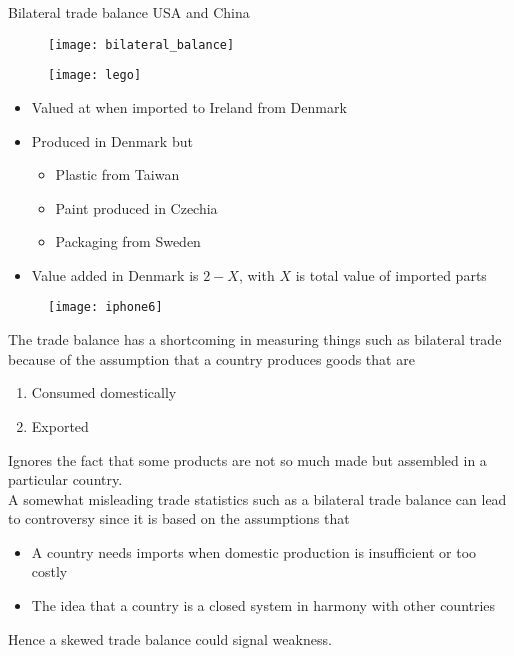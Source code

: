 \documentclass{beamer}
\begin{document}
\begin{frame}{Bilateral trade balance USA and China}
  \begin{figure}
    \texttt{[image: bilateral\_balance]}
  \end{figure}
\end{frame}


\begin{frame}{}
  \begin{figure}
    \texttt{[image: lego]}
  \end{figure}
  \begin{itemize}
    \item Valued at  when imported to Ireland from Denmark
    \item Produced in Denmark but
    \begin{itemize}
      \item Plastic from Taiwan
      \item Paint produced in Czechia
      \item Packaging from Sweden
    \end{itemize}
    \item Value added in Denmark is $2-X$, with $X$ is total value of imported parts
  \end{itemize}
\end{frame}

\begin{frame}
  \begin{figure}\centering
    \texttt{[image: iphone6]}
  \end{figure}
\end{frame}

\begin{frame}
  The trade balance has a shortcoming in measuring things such as bilateral trade because of the assumption that a country produces goods that are
  \begin{enumerate}
    \item Consumed domestically
    \item Exported
  \end{enumerate}
  Ignores the fact that some products are not so much made but assembled in a particular country.\\
  \bigskip
  A somewhat misleading trade statistics such as a bilateral trade balance can lead to controversy since it is based on the assumptions that  
  \begin{itemize}
    \item A country needs imports when domestic production is insufficient or too costly
    \item The idea that a country is a closed system in harmony with other countries
  \end{itemize}
 Hence a skewed trade balance could signal weakness.
\end{frame}
\end{document}
